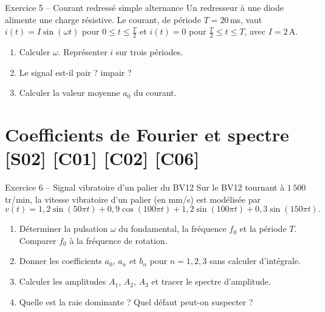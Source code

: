 \documentclass[a4paper,11pt]{article}
\begin{document}
\begin{exo}{Exercice 5 -- Courant redressé simple alternance}
\label{exo:5}
Un redresseur à une diode alimente une charge résistive. Le courant, de période $T = 20$\,ms, vaut $i(t) = I\sin(\omega t)$ pour $0\leq t\leq\frac T2$ et $i(t) = 0$ pour $\frac T2\leq t\leq T$, avec $I = 2$\,A.
\begin{enumerate}[label=\alph*)]
  \item Calculer $\omega$. Représenter $i$ sur trois périodes.
  \item Le signal est-il pair ? impair ?
  \item Calculer la valeur moyenne $a_0$ du courant.
\end{enumerate}
\end{exo}

\needspace{7cm}
\section{Coefficients de Fourier et spectre \hfill {\normalsize\color{uimmred}[S02] [C01] [C02] [C06]}}

\begin{exo}{Exercice 6 -- Signal vibratoire d'un palier du BV12}
\label{exo:6}
Sur le BV12 tournant à $1\,500$\,tr/min, la vitesse vibratoire d'un palier (en mm/s) est modélisée par
\[
v(t) = 1{,}2\sin(50\pi t) + 0{,}9\cos(100\pi t) + 1{,}2\sin(100\pi t) + 0{,}3\sin(150\pi t).
\]
\begin{enumerate}[label=\alph*)]
  \item Déterminer la pulsation $\omega$ du fondamental, la fréquence $f_0$ et la période $T$. Comparer $f_0$ à la fréquence de rotation.
  \item Donner les coefficients $a_0$, $a_n$ et $b_n$ pour $n = 1, 2, 3$ sans calculer d'intégrale.
  \item Calculer les amplitudes $A_1$, $A_2$, $A_3$ et tracer le spectre d'amplitude.
  \item Quelle est la raie dominante ? Quel défaut peut-on suspecter ?
\end{enumerate}
\end{exo}
\end{document}
